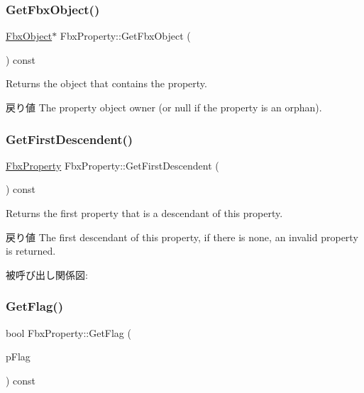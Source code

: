 \subsubsection{\texorpdfstring{Get\+Fbx\+Object()}{GetFbxObject()}}
{\footnotesize\ttfamily \hyperlink{class_fbx_object}{Fbx\+Object}$\ast$ Fbx\+Property\+::\+Get\+Fbx\+Object (\begin{DoxyParamCaption}{ }\end{DoxyParamCaption}) const}

Returns the object that contains the property. \begin{DoxyReturn}{戻り値}
The property object owner (or null if the property is an orphan). 
\end{DoxyReturn}
\mbox{\label{class_fbx_property_ad7f8dea372a3401119e18f23b03691f4}} 
\subsubsection{\texorpdfstring{Get\+First\+Descendent()}{GetFirstDescendent()}}
{\footnotesize\ttfamily \hyperlink{class_fbx_property}{Fbx\+Property} Fbx\+Property\+::\+Get\+First\+Descendent (\begin{DoxyParamCaption}{ }\end{DoxyParamCaption}) const}

Returns the first property that is a descendant of this property. \begin{DoxyReturn}{戻り値}
The first descendant of this property, if there is none, an invalid property is returned. 
\end{DoxyReturn}
被呼び出し関係図\+:
\mbox{\label{class_fbx_property_a08c9fefe4d1a34c091ff02386462c8d6}} 
\subsubsection{\texorpdfstring{Get\+Flag()}{GetFlag()}}
{\footnotesize\ttfamily bool Fbx\+Property\+::\+Get\+Flag (\begin{DoxyParamCaption}\item[{\hyperlink{class_fbx_property_flags_afabfa7e0949aac8a7dcdf8a141867e99}{Fbx\+Property\+Flags\+::\+E\+Flags}}]{p\+Flag }\end{DoxyParamCaption}) const}

